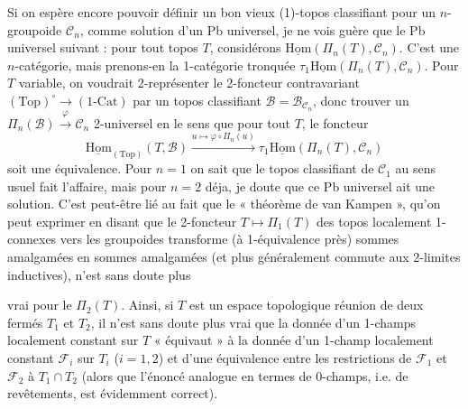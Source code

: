 \documentclass[11pt,a4paper]{article}
\begin{document}
Si on espère encore pouvoir définir un bon vieux (1)-topos classifiant pour un $n$-groupoide $\mathcal{C}_n$, comme solution d'un Pb universel, je ne vois guère que le Pb universel suivant : pour tout topos $T$, considérons $\underline{\mathrm{Hom}}(\Pi_n(T), \mathcal{C}_n)$. C'est une $n$-catégorie, mais prenons-en la 1-catégorie tronquée $\tau_1 \underline{\mathrm{Hom}}(\Pi_n(T), \mathcal{C}_n)$. Pour $T$ variable, on voudrait 2-représenter le 2-foncteur contravariant $(\mathrm{Top})^\circ \to (1\text{-}\mathrm{Cat})$ par un topos classifiant $\mathcal{B} = \mathcal{B}_{\mathcal{C}_n}$, donc trouver un $\Pi_n(\mathcal{B}) \xrightarrow{\varphi} \mathcal{C}_n$ 2-universel en le sens que pour tout $T$, le foncteur
\[
\underline{\mathrm{Hom}}_{(\mathrm{Top})}(T, \mathcal{B})
\xrightarrow{u \mapsto \varphi \circ \Pi_n(u)}
\tau_1 \underline{\mathrm{Hom}}(\Pi_n(T), \mathcal{C}_n)
\]
soit une équivalence. Pour $n = 1$ on sait que le topos classifiant de $\mathcal{C}_1$ au sens usuel fait l'affaire, mais pour $n = 2$ déja, je doute que ce Pb universel ait une solution. C'est peut-être lié au fait que le « théorème de van Kampen », qu'on peut exprimer en disant que le 2-foncteur $T \mapsto \Pi_1(T)$ des topos localement 1-connexes vers les groupoides transforme (à 1-équivalence près) sommes amalgamées en sommes amalgamées (et plus généralement commute aux 2-limites inductives), n'est sans doute plus

vrai pour le $\Pi_2(T)$. Ainsi, si $T$ est un espace topologique réunion de deux fermés $T_1$ et $T_2$, il n'est sans doute plus vrai que la donnée d'un 1-champs localement constant sur $T$ « équivaut » à la donnée d'un 1-champ localement constant $\mathcal{F}_i$ sur $T_i$ ($i = 1, 2$) et d'une équivalence entre les restrictions de $\mathcal{F}_1$ et $\mathcal{F}_2$ à $T_1 \cap T_2$ (alors que l'énoncé analogue en termes de 0-champs, i.e. de revêtements, est évidemment correct).
\end{document}
